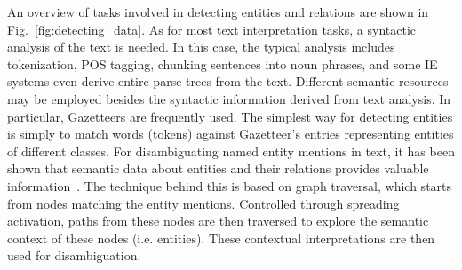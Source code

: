 An overview of tasks involved in detecting entities and relations are shown in Fig.~\ref{fig:detecting_data}. As for most text interpretation tasks, a syntactic analysis of the text is needed. In this case, the typical analysis includes tokenization, POS tagging, chunking sentences into noun phrases, and some IE systems even derive entire parse trees from the text. Different semantic resources may be employed besides the syntactic information derived from text analysis. In particular, Gazetteers are frequently used. 
The simplest way for detecting entities is simply to match words (tokens) against Gazetteer's entries representing entities of different classes. For disambiguating named entity mentions in text, it has been shown that semantic data about entities and their relations provides valuable information~\cite{DBLP:conf/esws/KlebA10}. The technique behind this is based on graph traversal, which starts from nodes matching the entity mentions. Controlled through spreading activation, paths from these nodes are then traversed to explore the semantic context of these nodes (i.e. entities). These contextual interpretations are then used for disambiguation. 

